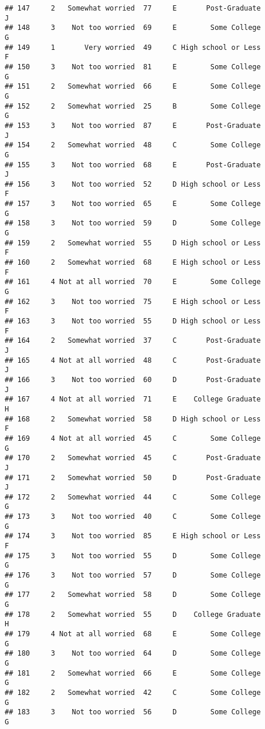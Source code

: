 \documentclass[
]{article}
\begin{document}
\begin{verbatim}
## 147     2   Somewhat worried  77     E       Post-Graduate         J
## 148     3    Not too worried  69     E        Some College         G
## 149     1       Very worried  49     C High school or Less         F
## 150     3    Not too worried  81     E        Some College         G
## 151     2   Somewhat worried  66     E        Some College         G
## 152     2   Somewhat worried  25     B        Some College         G
## 153     3    Not too worried  87     E       Post-Graduate         J
## 154     2   Somewhat worried  48     C        Some College         G
## 155     3    Not too worried  68     E       Post-Graduate         J
## 156     3    Not too worried  52     D High school or Less         F
## 157     3    Not too worried  65     E        Some College         G
## 158     3    Not too worried  59     D        Some College         G
## 159     2   Somewhat worried  55     D High school or Less         F
## 160     2   Somewhat worried  68     E High school or Less         F
## 161     4 Not at all worried  70     E        Some College         G
## 162     3    Not too worried  75     E High school or Less         F
## 163     3    Not too worried  55     D High school or Less         F
## 164     2   Somewhat worried  37     C       Post-Graduate         J
## 165     4 Not at all worried  48     C       Post-Graduate         J
## 166     3    Not too worried  60     D       Post-Graduate         J
## 167     4 Not at all worried  71     E    College Graduate         H
## 168     2   Somewhat worried  58     D High school or Less         F
## 169     4 Not at all worried  45     C        Some College         G
## 170     2   Somewhat worried  45     C       Post-Graduate         J
## 171     2   Somewhat worried  50     D       Post-Graduate         J
## 172     2   Somewhat worried  44     C        Some College         G
## 173     3    Not too worried  40     C        Some College         G
## 174     3    Not too worried  85     E High school or Less         F
## 175     3    Not too worried  55     D        Some College         G
## 176     3    Not too worried  57     D        Some College         G
## 177     2   Somewhat worried  58     D        Some College         G
## 178     2   Somewhat worried  55     D    College Graduate         H
## 179     4 Not at all worried  68     E        Some College         G
## 180     3    Not too worried  64     D        Some College         G
## 181     2   Somewhat worried  66     E        Some College         G
## 182     2   Somewhat worried  42     C        Some College         G
## 183     3    Not too worried  56     D        Some College         G

\end{verbatim}
\end{document}

